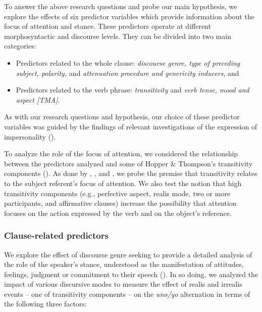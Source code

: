 \documentclass[output=paper]{langscibook}
\begin{document}
To answer the above research questions and probe our main hypothesis, we explore the effects of six predictor variables which provide information about the focus of attention and stance. These predictors operate at different morphosyntactic and discourse levels. They can be divided into two main categories:  

\begin{itemize}
    \item Predictors related to the whole clause: \textit{discourse genre, type of preceding subject, polarity,} and \textit{attenuation procedure and genericity inducers}, and 
    \item Predictors related to the verb phrase: \textit{transitivity} and \textit{verb tense, mood and aspect [TMA]}. 
\end{itemize}

As with our research questions and hypothesis, our choice of these predictor variables was guided by the findings of relevant investigations of the expression of impersonality (\citealt{DeCock2014, Flores-Ferrán2009, Guirado2011, GonzálezVergaraRojas2012, Hernanz1990, HurtadoOrtega-Santos2019, OrozcoHurtado2021b, RepedeLeon-Castro2019}). 



To analyze the role of the focus of attention, we considered the relationship between the predictors analyzed and some of Hopper \& Thompson’s transitivity components (\citeyear[252]{HopperThompson1980}). As done by \citet{AijónOlivaSerrano2013}, \citet{HurtadoOrtega-Santos2019}, and \citet{Posio2011}, we probe the premise that transitivity relates to the subject referent’s focus of attention. We also test the notion that high transitivity components (e.g., perfective aspect, realis mode, two or more participants, and affirmative clauses) increase the possibility that attention focuses on the action expressed by the verb and on the object’s reference.   


\subsubsection{Clause-related predictors}\label{sec:orozco:3.3.1}

\label{sec:orozco:3.3.1.1}
 
We explore the effect of discourse genre seeking to provide a detailed analysis of the role of the speaker’s stance, understood as the manifestation of attitudes, feelings, judgment or commitment to their speech (\citealt{BiberFinegan1988}). In so doing, we analyzed the impact of various discursive modes to measure the effect of realis and irrealis events – one of  transitivity components – on the \textit{uno/yo} alternation in terms of the following three factors: 
\end{document}
